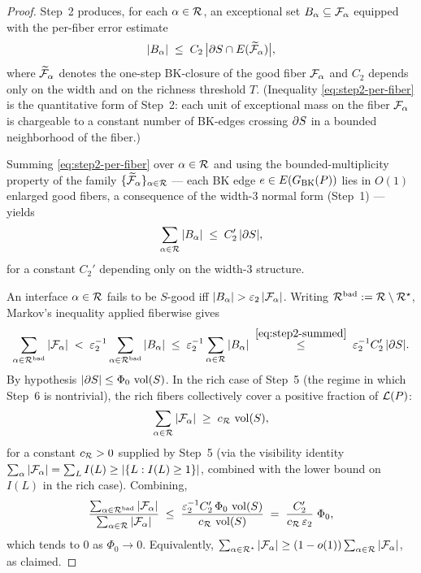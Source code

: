 \begin{proof}
Step~2 produces, for each $\alpha\in\mathcal{R}$, an exceptional set
$B_\alpha\subseteq\mathcal{F}_{\alpha}$ equipped with the per-fiber error
estimate
\begin{equation}\label{eq:step2-per-fiber}
|B_\alpha|
 \;\le\; C_2\,\bigl|\partial S \cap E(\widetilde{\mathcal{F}}_{\alpha})\bigr|,
\end{equation}
where $\widetilde{\mathcal{F}}_{\alpha}$ denotes the one-step BK-closure of the
good fiber $\mathcal{F}_{\alpha}$ and $C_2$ depends only on the width and on
the richness threshold $T$.  (Inequality
\eqref{eq:step2-per-fiber} is the quantitative form of Step~2: each
unit of exceptional mass on the fiber $\mathcal{F}_{\alpha}$ is chargeable
to a constant number of BK-edges crossing $\partial S$ in a bounded
neighborhood of the fiber.)

Summing \eqref{eq:step2-per-fiber} over $\alpha\in\mathcal{R}$ and using the
bounded-multiplicity property of the family
$\{\widetilde{\mathcal{F}}_{\alpha}\}_{\alpha\in\mathcal{R}}$ --- each BK edge
$e\in E(G_{\mathrm{BK}}(P))$ lies in $O(1)$ enlarged good fibers, a consequence
of the width-3 normal form (Step~1) --- yields
\begin{equation}\label{eq:step2-summed}
\sum_{\alpha\in\mathcal{R}} |B_\alpha|
 \;\le\; C_2'\,|\partial S|,
\end{equation}
for a constant $C_2'$ depending only on the width-3 structure.

An interface $\alpha\in\mathcal{R}$ fails to be $S$-good iff
$|B_\alpha|>\varepsilon_2\,|\fiber{\alpha}|$.  Writing
$\mathcal{R}^{\mathrm{bad}}:=\mathcal{R}\setminus\mathcal{R}^\star$, Markov's inequality
applied fiberwise gives
\[
\sum_{\alpha\in\mathcal{R}^{\mathrm{bad}}} |\mathcal{F}_{\alpha}|
 \;<\; \varepsilon_2^{-1}
       \sum_{\alpha\in\mathcal{R}^{\mathrm{bad}}} |B_\alpha|
 \;\le\; \varepsilon_2^{-1}
       \sum_{\alpha\in\mathcal{R}} |B_\alpha|
 \;\stackrel{\eqref{eq:step2-summed}}{\le}\;
       \varepsilon_2^{-1} C_2'\,|\partial S|.
\]
By hypothesis $|\partial S|\le \Phi_0\,\operatorname{vol}(S)$.  In the rich case of
Step~5 (the regime in which Step~6 is nontrivial), the rich fibers
collectively cover a positive fraction of $\mathcal{L}(P)$:
\begin{equation}\label{eq:rich-covers}
\sum_{\alpha\in\mathcal{R}} |\mathcal{F}_{\alpha}|
 \;\ge\; c_{\mathcal{R}}\,\operatorname{vol}(S),
\end{equation}
for a constant $c_{\mathcal{R}}>0$ supplied by Step~5 (via the visibility
identity $\sum_\alpha|\mathcal{F}_{\alpha}|=\sum_L I(L)\ge
|\{L:I(L)\ge 1\}|$, combined with the lower bound on $I(L)$ in the
rich case).  Combining,
\[
\frac{\sum_{\alpha\in\mathcal{R}^{\mathrm{bad}}}|\mathcal{F}_{\alpha}|}
     {\sum_{\alpha\in\mathcal{R}}|\mathcal{F}_{\alpha}|}
 \;\le\;
 \frac{\varepsilon_2^{-1} C_2'\,\Phi_0\,\operatorname{vol}(S)}
      {c_{\mathcal{R}}\,\operatorname{vol}(S)}
 \;=\;
 \frac{C_2'}{c_{\mathcal{R}}\,\varepsilon_2}\;\Phi_0,
\]
which tends to $0$ as $\Phi_0\to 0$.  Equivalently,
$\sum_{\alpha\in\mathcal{R}^\star}|\mathcal{F}_{\alpha}|\ge (1-o(1))
 \sum_{\alpha\in\mathcal{R}}|\mathcal{F}_{\alpha}|$, as claimed.
\end{proof}


